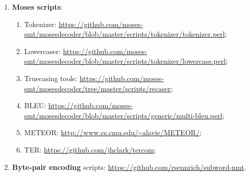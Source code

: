 \begin{enumerate}
	\item \textbf{Moses scripts}:
	\begin{enumerate}
	    \item Tokenizer: \url{https://github.com/moses-smt/mosesdecoder/blob/master/scripts/tokenizer/tokenizer.perl};
	    \item Lowercaser: \url{https://github.com/moses-smt/mosesdecoder/blob/master/scripts/tokenizer/lowercase.perl};
	    \item Truecasing tools: \url{https://github.com/moses-smt/mosesdecoder/tree/master/scripts/recaser};
	    \item BLEU: \url{https://github.com/moses-smt/mosesdecoder/blob/master/scripts/generic/multi-bleu.perl};
	    \item METEOR: \url{http://www.cs.cmu.edu/~alavie/METEOR/};
	    \item TER: \url{https://github.com/jhclark/tercom};
	\end{enumerate}
	\item \textbf{Byte-pair encoding} scripts: \url{https://github.com/rsennrich/subword-nmt}.
\end{enumerate}